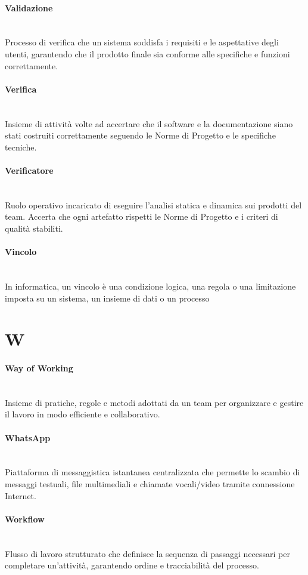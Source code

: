 \documentclass[a4paper, 10pt, colorlinks=true, linkcolor=black, urlcolor=blue, citecolor=blue, hidelinks]{article}
\newcommand{\glossaryterm}[2]{
    \paragraph{#1 \label{term:#1}} \mbox{} \\
    #2
    \vspace{0.5em}
}
\begin{document}
\glossaryterm{Validazione}{Processo di verifica che un sistema soddisfa i requisiti e le aspettative degli utenti, garantendo che il prodotto finale sia conforme alle specifiche e funzioni correttamente.}

\glossaryterm{Verifica}{Insieme di attività volte ad accertare che il software e la documentazione siano stati costruiti correttamente seguendo le Norme di Progetto e le specifiche tecniche.}

\glossaryterm{Verificatore}{Ruolo operativo incaricato di eseguire l'analisi statica e dinamica sui prodotti del team. Accerta che ogni artefatto rispetti le Norme di Progetto e i criteri di qualità stabiliti.}

\glossaryterm{Vincolo}{In informatica, un vincolo è una condizione logica, una regola o una limitazione imposta su un sistema, un insieme di dati o un processo}

\newpage

\section*{W}

\glossaryterm{Way of Working}{Insieme di pratiche, regole e metodi adottati da un team per organizzare e gestire il lavoro in modo efficiente e collaborativo.}

\glossaryterm{WhatsApp}{Piattaforma di messaggistica istantanea centralizzata che permette lo scambio di messaggi testuali, file multimediali e chiamate vocali/video tramite connessione Internet.}

\glossaryterm{Workflow}{Flusso di lavoro strutturato che definisce la sequenza di passaggi necessari per completare un'attività, garantendo ordine e tracciabilità del processo.}
\end{document}
